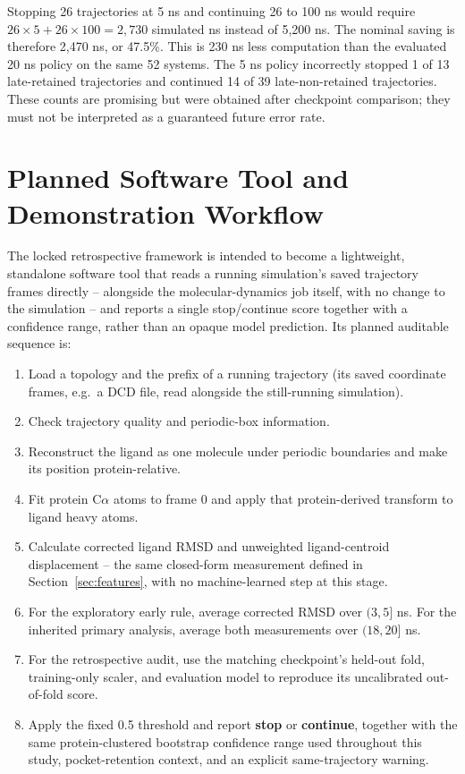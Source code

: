 \documentclass[11pt]{article}
\begin{document}
Stopping 26 trajectories at 5 ns and continuing 26 to 100 ns would require $26\times5+26\times100=2{,}730$ simulated ns instead of 5,200 ns. The nominal saving is therefore 2,470 ns, or 47.5\%. This is 230 ns less computation than the evaluated 20 ns policy on the same 52 systems. The 5 ns policy incorrectly stopped 1 of 13 late-retained trajectories and continued 14 of 39 late-non-retained trajectories. These counts are promising but were obtained after checkpoint comparison; they must not be interpreted as a guaranteed future error rate.

\section{Planned Software Tool and Demonstration Workflow}

The locked retrospective framework is intended to become a lightweight, standalone software tool that reads a running simulation's saved trajectory frames directly -- alongside the molecular-dynamics job itself, with no change to the simulation -- and reports a single stop/continue score together with a confidence range, rather than an opaque model prediction. Its planned auditable sequence is:

\begin{enumerate}
    \item Load a topology and the prefix of a running trajectory (its saved coordinate frames, e.g.\ a DCD file, read alongside the still-running simulation).
    \item Check trajectory quality and periodic-box information.
    \item Reconstruct the ligand as one molecule under periodic boundaries and make its position protein-relative.
    \item Fit protein C$\alpha$ atoms to frame 0 and apply that protein-derived transform to ligand heavy atoms.
    \item Calculate corrected ligand RMSD and unweighted ligand-centroid displacement -- the same closed-form measurement defined in Section~\ref{sec:features}, with no machine-learned step at this stage.
    \item For the exploratory early rule, average corrected RMSD over $(3,5]$ ns. For the inherited primary analysis, average both measurements over $(18,20]$ ns.
    \item For the retrospective audit, use the matching checkpoint's held-out fold, training-only scaler, and evaluation model to reproduce its uncalibrated out-of-fold score.
    \item Apply the fixed 0.5 threshold and report \textbf{stop} or \textbf{continue}, together with the same protein-clustered bootstrap confidence range used throughout this study, pocket-retention context, and an explicit same-trajectory warning.
\end{enumerate}
\end{document}
